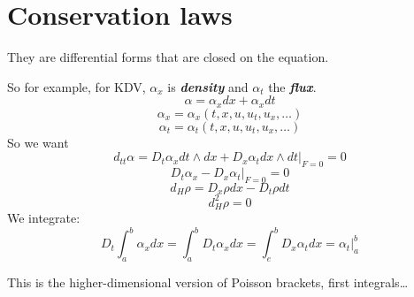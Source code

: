 \section{Conservation laws}

They are differential forms that are closed on the equation.

So for example, for KDV, $\alpha_x$ is \textit{\textbf{density}} and  $\alpha_t$ the \textit{\textbf{flux}}.
 \[\alpha=\alpha_x dx+\alpha_x dt\]
 \[\alpha_x=\alpha_x (t,x,u,u_t,u_x,\ldots)\]
 \[\alpha_t=\alpha_t(t,x,u,u_t,u_x,\ldots)\]
 So we want
 \[d_{t t}\alpha=D_t\alpha_x dt \wedge dx+ D_x \alpha_t dx \wedge dt\Big|_{F=0}=0\]
\[D_t\alpha_x-D_x \alpha_t \Big|_{F=0}=0\]
\[d_H\rho=D_x\rho dx-D_t\rho dt\]
\[d^2_H\rho=0\]
We integrate:
\[D_t \int_{a}^b\alpha_x dx=\int_{a}^b D_t \alpha_x dx=\int_{e}^b D_x \alpha_t dx=\alpha_t|_{a}^b\]



 
\begin{upshot}\leavevmode
	This is the higher-dimensional version of Poisson brackets, first integrals…
\end{upshot} 
 



